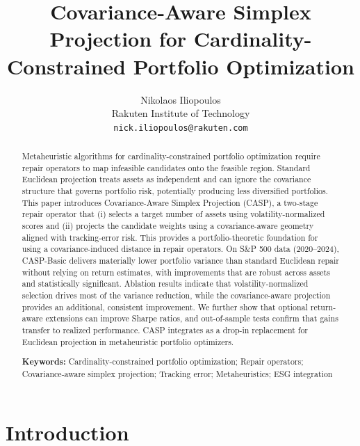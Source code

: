 \documentclass[10pt,twocolumn,a4paper]{article}
\title{\textbf{Covariance-Aware Simplex Projection for Cardinality-Constrained Portfolio Optimization}}
\author{
  Nikolaos Iliopoulos \\
  \small Rakuten Institute of Technology \\
  \small \texttt{nick.iliopoulos@rakuten.com}
}
\date{}
\begin{document}
\twocolumn[
  \begin{@twocolumnfalse}
    \maketitle
  \end{@twocolumnfalse}
]

\begin{abstract}
\noindent
Metaheuristic algorithms for cardinality-constrained portfolio optimization require repair operators to map infeasible candidates onto the feasible region. Standard Euclidean projection treats assets as independent and can ignore the covariance structure that governs portfolio risk, potentially producing less diversified portfolios. This paper introduces Covariance-Aware Simplex Projection (CASP), a two-stage repair operator that (i) selects a target number of assets using volatility-normalized scores and (ii) projects the candidate weights using a covariance-aware geometry aligned with tracking-error risk. This provides a portfolio-theoretic foundation for using a covariance-induced distance in repair operators. On S\&P 500 data (2020--2024), CASP-Basic delivers materially lower portfolio variance than standard Euclidean repair without relying on return estimates, with improvements that are robust across assets and statistically significant. Ablation results indicate that volatility-normalized selection drives most of the variance reduction, while the covariance-aware projection provides an additional, consistent improvement. We further show that optional return-aware extensions can improve Sharpe ratios, and out-of-sample tests confirm that gains transfer to realized performance. CASP integrates as a drop-in replacement for Euclidean projection in metaheuristic portfolio optimizers.

\medskip
\noindent\textbf{Keywords:} Cardinality-constrained portfolio optimization; Repair operators; Covariance-aware simplex projection; Tracking error; Metaheuristics; ESG integration
\end{abstract}

\section{Introduction}
\label{sec:intro}
\end{document}
